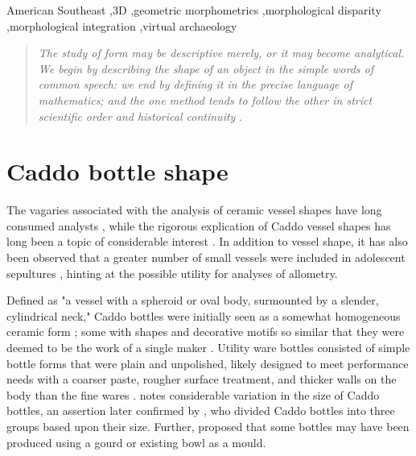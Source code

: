 \documentclass[review]{elsarticle}
\begin{document}
\begin{frontmatter}
\begin{keyword}
American Southeast \sep 3D \sep geometric morphometrics \sep morphological disparity \sep morphological integration \sep virtual archaeology
\end{keyword}

\end{frontmatter}

\linenumbers

\begin{quote}
\textit{The study of form may be descriptive merely, or it may become analytical. We begin by describing the shape of an object in the simple words of common speech: we end by defining it in the precise language of mathematics; and the one method tends to follow the other in strict scientific order and historical continuity }\citep{RN11532}.
\end{quote}

\section{Caddo bottle shape}

The vagaries associated with the analysis of ceramic vessel shapes have long consumed analysts \citep{RN6182,RN11536,RN11537,RN11538,RN5895}, while the rigorous explication of Caddo vessel shapes has long been a topic of considerable interest \citep{RN4769,RN4773}. In addition to vessel shape, it has also been observed that a greater number of small vessels were included in adolescent sepultures \citep{RN2917}, hinting at the possible utility for analyses of allometry. 

Defined as "a vessel with a spheroid or oval body, surmounted by a slender, cylindrical neck," Caddo bottles were initially seen as a somewhat homogeneous ceramic form \citep[187]{RN2151}; some with shapes and decorative motifs so similar that they were deemed to be the work of a single maker \citep[188]{RN2151}. Utility ware bottles consisted of simple bottle forms that were plain and unpolished, likely designed to meet performance needs with a coarser paste, rougher surface treatment, and thicker walls on the body than the fine wares \citep[32]{RN11637}. \citet[Plate LXXI]{RN2151} notes considerable variation in the size of Caddo bottles, an assertion later confirmed by \citet[45]{RN2342}, who divided Caddo bottles into three groups based upon their size. Further, \citet[Plate XCV]{RN2151} proposed that some bottles may have been produced using a gourd or existing bowl as a mould. 
\end{document}
